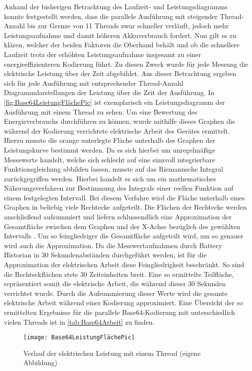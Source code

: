 Anhand der bisherigen Betrachtung des Laufzeit- und Leistungsdiagramms konnte festgestellt werden, dass die parallele Ausführung mit steigender Thread-Anzahl bis zur Grenze von 11 Threads zwar schneller verläuft, jedoch mehr Leistungsaufnahme und damit höheren Akkuverbrauch fordert. Nun gilt es zu klären, welcher der beiden Faktoren die Oberhand behält und ob die schnellere Laufzeit trotz der erhöhten Leistungsaufnahme insgesamt zu einer energieeffizienteren Kodierung führt. Zu diesen Zweck wurde für jede Messung die elektrische Leistung über der Zeit abgebildet. Aus dieser Betrachtung ergeben sich für jede Ausführung mit entsprechender Thread-Anzahl Diagrammdarstellungen der Leistung über die Zeit der Ausführung.  In \autoref{fig:Base64LeistungFlächePic} ist exemplarisch ein Leistungsdiagramm der Ausführung mit einem Thread zu sehen. Um eine Bewertung des Energieverbrauchs durchführen zu können, wurde mithilfe dieses Graphen die während der Kodierung verrichtete elektrische Arbeit des Gerätes ermittelt. Hierzu musste die orange unterlegte Fläche unterhalb des Graphen der Leistungskurve bestimmt werden. Da es sich hierbei um unregelmäßige Messewerte handelt, welche sich schlecht auf eine sinnvoll integrierbare Funktionsgleichung abbilden lassen, musste auf das Riemannsche Integral zurückgegriffen werden. Hierbei handelt es sich um ein mathematisches Näherungsverfahren zur Bestimmung des Integrals einer reellen Funktion auf einem festgelegten Intervall. Bei diesem Verfahre wird die Fläche unterhalb eines Graphen in beliebig viele Rechtecke aufgeteilt. Die Flächen der Rechtecke werden anschließend aufsummiert und liefern schlussendlich eine Approximation der Gesamtfläche  zwischen dem Graphen und der X-Achse bezüglich des gewählten Intervalls \cite[479]{Mathebuch}. Um so feingliedriger die Gesamtfläche aufgeteilt wird, um so genauer wird auch die Approximation. Da die Messwertaufnahmen durch Battery Historian in 30 Sekundenabständen durchgeführt werden, ist für die Approximation der elektrischen Arbeit diese Feingliedrigkeit beschränkt. So sind die Rechteckflächen stets 30 Zeiteinheiten breit. Eine so ermittelte Teilfläche, repräsentiert somit die elektrische Arbeit, die während dieser 30 Sekunden verrichtet wurde. Durch die Aufsummierung dieser Werte wird die gesamte elektrische Arbeit während einer Kodierung approximiert. Eine Übersicht der so ermittelten Ergebnisse  für die parallele Base64-Kodierung mit unterschiedlich vielen Threads ist in \autoref{tab:Base64Arbeit} zu finden.

\begin{figure}[H]
	\begin{center}	 
	\texttt{[image: Base64LeistungFlächePic]}
	\caption{Verlauf der elektrischen Leistung mit einem Thread (eigene Abbildung)}
	\label{fig:Base64LeistungFlächePic} 
	\end{center}
\end{figure}


